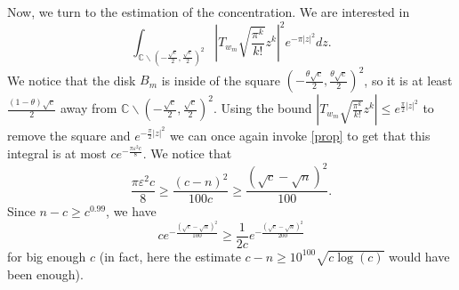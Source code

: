 \documentclass[12pt]{amsart}
\numberwithin{equation}{section}
\newcommand{\Cm}{\mathbb{C}}
\newcommand{\eps}{\varepsilon}
\begin{document}
Now, we turn to the estimation of the concentration. We are interested in
$$\int_{\Cm \backslash\left(-\frac{\sqrt{c}}{2},\frac{\sqrt{c}}{2}\right)^2}\left|T_{w_m}\sqrt{\frac{\pi^k}{k!}}z^k\right|^2 e^{-\pi |z|^2}dz.$$
We notice that the disk $B_m$ is inside of the square $\left(-\frac{\theta\sqrt{c}}{2},\frac{\theta\sqrt{c}}{2}\right)^2$, so it is at least $\frac{(1-\theta)\sqrt{c}}{2}$ away from $\Cm \backslash\left(-\frac{\sqrt{c}}{2},\frac{\sqrt{c}}{2}\right)^2$. Using the bound $\left|T_{w_m}\sqrt{\frac{\pi^k}{k!}}z^k\right| \le e^{\frac{\pi}{2}|z|^2}$ to remove the square and $e^{-\frac{\pi}{2}|z|^2}$ we can once again invoke \eqref{prop} to get that this integral is at most $ce^{-\frac{\pi \eps^2 c}{8}}$. We notice that $$\frac{\pi \eps^2 c}{8} \ge \frac{(c-n)^2}{100c} \ge \frac{(\sqrt{c}-\sqrt{n})^2}{100}.$$  Since $n-c\ge c^{0.99}$, we have $$ce^{-\frac{(\sqrt{c}-\sqrt{n})^2}{100}} \ge \frac{1}{2c}e^{-\frac{(\sqrt{c}-\sqrt{n})^2}{200}}$$
for big enough $c$ (in fact, here the estimate $c-n \ge 10^{100}\sqrt{c\log(c)}$ would have been enough).
\end{document}
